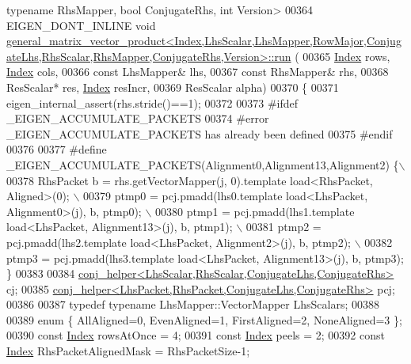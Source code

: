 \begin{DoxyCode}
{{      typename} RhsMapper, \textcolor{keywordtype}{bool} ConjugateRhs, \textcolor{keywordtype}{int} Version>
00364 EIGEN\_DONT\_INLINE \textcolor{keywordtype}{void} 
      \hyperlink{struct_eigen_1_1internal_1_1general__matrix__vector__product}{
      general\_matrix\_vector\_product<Index,LhsScalar,LhsMapper,RowMajor,ConjugateLhs,RhsScalar,RhsMapper,ConjugateRhs,Version>::run}
      (
00365   \hyperlink{namespace_eigen_a62e77e0933482dafde8fe197d9a2cfde}{Index} rows, \hyperlink{namespace_eigen_a62e77e0933482dafde8fe197d9a2cfde}{Index} cols,
00366   \textcolor{keyword}{const} LhsMapper& lhs,
00367   \textcolor{keyword}{const} RhsMapper& rhs,
00368   ResScalar* res, \hyperlink{namespace_eigen_a62e77e0933482dafde8fe197d9a2cfde}{Index} resIncr,
00369   ResScalar alpha)
00370 \{
00371   eigen\_internal\_assert(rhs.stride()==1);
00372 
00373 \textcolor{preprocessor}{  #ifdef \_EIGEN\_ACCUMULATE\_PACKETS}
00374 \textcolor{preprocessor}{  #error \_EIGEN\_ACCUMULATE\_PACKETS has already been defined}
00375 \textcolor{preprocessor}{  #endif}
00376 
00377 \textcolor{preprocessor}{  #define \_EIGEN\_ACCUMULATE\_PACKETS(Alignment0,Alignment13,Alignment2) \{\(\backslash\)}
00378 \textcolor{preprocessor}{    RhsPacket b = rhs.getVectorMapper(j, 0).template load<RhsPacket, Aligned>(0);  \(\backslash\)}
00379 \textcolor{preprocessor}{    ptmp0 = pcj.pmadd(lhs0.template load<LhsPacket, Alignment0>(j), b, ptmp0); \(\backslash\)}
00380 \textcolor{preprocessor}{    ptmp1 = pcj.pmadd(lhs1.template load<LhsPacket, Alignment13>(j), b, ptmp1); \(\backslash\)}
00381 \textcolor{preprocessor}{    ptmp2 = pcj.pmadd(lhs2.template load<LhsPacket, Alignment2>(j), b, ptmp2); \(\backslash\)}
00382 \textcolor{preprocessor}{    ptmp3 = pcj.pmadd(lhs3.template load<LhsPacket, Alignment13>(j), b, ptmp3); \}}
00383 
00384   \hyperlink{struct_eigen_1_1internal_1_1conj__helper}{conj\_helper<LhsScalar,RhsScalar,ConjugateLhs,ConjugateRhs>}
       cj;
00385   \hyperlink{struct_eigen_1_1internal_1_1conj__helper}{conj\_helper<LhsPacket,RhsPacket,ConjugateLhs,ConjugateRhs>}
       pcj;
00386 
00387   \textcolor{keyword}{typedef} \textcolor{keyword}{typename} LhsMapper::VectorMapper LhsScalars;
00388 
00389   \textcolor{keyword}{enum} \{ AllAligned=0, EvenAligned=1, FirstAligned=2, NoneAligned=3 \};
00390   \textcolor{keyword}{const} \hyperlink{namespace_eigen_a62e77e0933482dafde8fe197d9a2cfde}{Index} rowsAtOnce = 4;
00391   \textcolor{keyword}{const} \hyperlink{namespace_eigen_a62e77e0933482dafde8fe197d9a2cfde}{Index} peels = 2;
00392   \textcolor{keyword}{const} \hyperlink{namespace_eigen_a62e77e0933482dafde8fe197d9a2cfde}{Index} RhsPacketAlignedMask = RhsPacketSize-1;
}
\end{DoxyCode}
